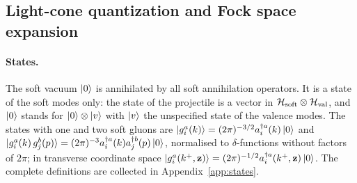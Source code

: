 \subsection{Light-cone quantization and Fock space expansion}\label{sec:fock}

\paragraph{States.} The soft vacuum $\ket0$ is annihilated by all soft annihilation operators. It is a state of the soft modes only: the state of the projectile is a vector in $\mathcal H_{\rm soft}\otimes\mathcal H_{\rm val}$, and $\ket0$ stands for $\ket0\otimes\ket v$ with $\ket v$ the unspecified state of the valence modes. The states with one and two soft gluons are $\ket{g^a_i(k)}=(2\pi)^{-3/2}a^{\dagger a}_i(k)\ket0$ and $\ket{g^a_i(k)\,g^b_j(p)}=(2\pi)^{-3}a^{\dagger a}_i(k)a^{\dagger b}_j(p)\ket0$, normalised to $\delta$-functions without factors of $2\pi$; in transverse coordinate space $\ket{g^a_i(k^+,\mathbf{z})}=(2\pi)^{-1/2}a^{\dagger a}_i(k^+,\mathbf{z})\ket0$. The complete definitions are collected in Appendix~\ref{app:states}.

